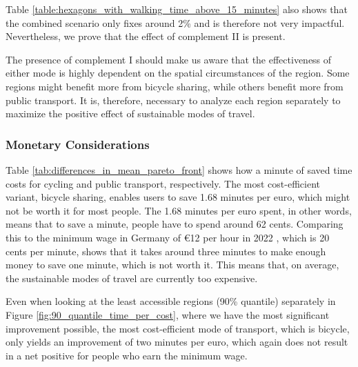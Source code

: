 Table \ref{table:hexagons_with_walking_time_above_15_minutes} also shows that the combined scenario only fixes around 2\% and is therefore not very impactful.
Nevertheless, we prove that the effect of complement II is present.

The presence of complement I should make us aware that the effectiveness of either mode is highly dependent on the spatial circumstances of the region.
Some regions might benefit more from bicycle sharing, while others benefit more from public transport.
It is, therefore, necessary to analyze each region separately to maximize the positive effect of sustainable modes of travel.





\subsubsection{Monetary Considerations}

Table \ref{tab:differences_in_mean_pareto_front} shows how a minute of saved time costs for cycling and public transport, respectively.
The most cost-efficient variant, bicycle sharing, enables users to save 1.68 minutes per euro, which might not be worth it for most people.
The 1.68 minutes per euro spent, in other words, means that to save a minute, people have to spend around 62 cents.
Comparing this to the minimum wage in Germany of \euro{12} per hour in 2022 , which is 20 cents per minute, shows that it takes around three minutes to make enough money to save one minute, which is not worth it.
This means that, on average, the sustainable modes of travel are currently too expensive.

Even when looking at the least accessible regions (90\% quantile) separately in Figure \ref{fig:90_quantile_time_per_cost}, where we have the most significant improvement possible, the most cost-efficient mode of transport, which is bicycle, only yields an improvement of two minutes per euro, which again does not result in a net positive for people who earn the minimum wage.


